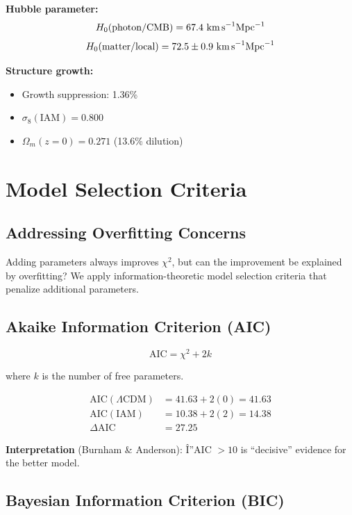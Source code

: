 \documentclass[twocolumn,superscriptaddress,prl,amsmath,amssymb]{revtex4-2}
\begin{document}
\textbf{Hubble parameter:}
\begin{equation}
H_0(\text{photon/CMB}) = 67.4 \text{ km\,s}^{-1}\text{Mpc}^{-1}
\end{equation}
\begin{equation}
H_0(\text{matter/local}) = 72.5 \pm 0.9 \text{ km\,s}^{-1}\text{Mpc}^{-1}
\end{equation}

\textbf{Structure growth:}
\begin{itemize}
\item Growth suppression: 1.36\%
\item $\sigma_8(\text{IAM}) = 0.800$
\item $\Omega_m(z=0) = 0.271$ (13.6\% dilution)
\end{itemize}

\section{Model Selection Criteria}

\subsection{Addressing Overfitting Concerns}

Adding parameters always improves $\chi^2$, but can the improvement be explained by overfitting? We apply information-theoretic model selection criteria that penalize additional parameters.

\subsection{Akaike Information Criterion (AIC)}

\begin{equation}
\text{AIC} = \chi^2 + 2k
\end{equation}

where $k$ is the number of free parameters.

\begin{align}
\text{AIC}(\Lambda\text{CDM}) &= 41.63 + 2(0) = 41.63 \nonumber\\
\text{AIC}(\text{IAM}) &= 10.38 + 2(2) = 14.38 \nonumber\\
\Delta\text{AIC} &= 27.25
\end{align}

\textbf{Interpretation} (Burnham \& Anderson): Î”AIC $> 10$ is ``decisive'' evidence for the better model.

\subsection{Bayesian Information Criterion (BIC)}
\end{document}
